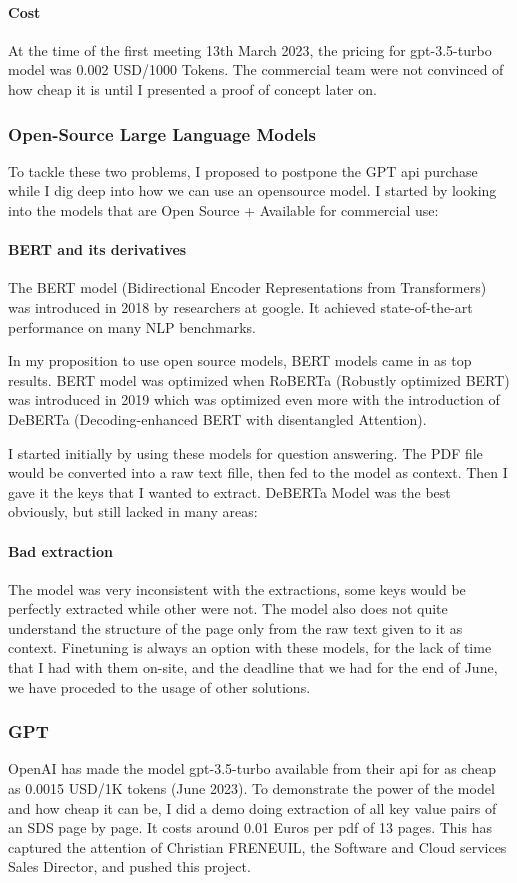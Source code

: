 \documentclass[a4paper,12pt,twoside]{report}
\begin{document}
\paragraph{Cost}
At the time of the first meeting 13th March 2023, the pricing for gpt-3.5-turbo model was 0.002 USD/1000 Tokens. The commercial team were not convinced of how cheap it is until I presented a proof of concept later on.
\subsubsection{Open-Source Large Language Models}
To tackle these two problems, I proposed to postpone the GPT api purchase while I dig deep into how we can use an opensource model. I started by looking into the models that are Open Source + Available for commercial use:
\paragraph{BERT and its derivatives}
The BERT model \cite{devlin2019bert} (Bidirectional Encoder Representations from Transformers) was introduced in 2018 by researchers at google. It achieved state-of-the-art performance on many NLP benchmarks. 

In my proposition to use open source models, BERT models came in as top results. BERT model was optimized when RoBERTa\cite{liu2019roberta} (Robustly optimized BERT) was introduced in 2019 which was optimized even more with the introduction of DeBERTa \cite{he2021deberta} (Decoding-enhanced BERT with disentangled Attention).

I started initially by using these models for question answering. The PDF file would be converted into a raw text fille, then fed to the model as context. Then I gave it the keys that I wanted to extract. DeBERTa Model was the best obviously, but still lacked in many areas:
\paragraph{Bad extraction}
The model was very inconsistent with the extractions, some keys would be perfectly extracted while other were not. The model also does not quite understand the structure of the page only from the raw text given to it as context.
Finetuning is always an option with these models, for the lack of time that I had with them on-site, and the deadline that we had for the end of June, we have proceded to the usage of other solutions.
\subsubsection{GPT}
OpenAI has made the model gpt-3.5-turbo available from their api for as cheap as 0.0015 USD/1K tokens (June 2023). To demonstrate the power of the model and how cheap it can be, I did a demo doing extraction of all key value pairs of an SDS page by page. It costs around 0.01 Euros per pdf of 13 pages. This has captured the attention of Christian FRENEUIL, the Software and Cloud services Sales Director, and pushed this project. 
\end{document}
